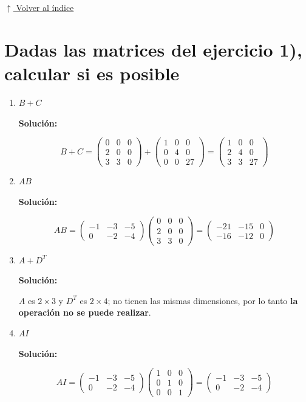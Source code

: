 \documentclass[12pt]{article}
\newcommand{\solucion}{%
    \vspace{0.8em}%
    \textbf{Solución:}%
}
\newcommand{\volverindice}{%
    \vspace{1em}%
    \begin{flushright}%
        \hyperlink{indice}{\small $\uparrow$ Volver al índice}%
    \end{flushright}%
}
\begin{document}
\volverindice
\newpage

\section{Dadas las matrices del ejercicio 1), calcular si es posible}

\begin{enumerate}[label=\alph*.-]
    \item $B + C$

    \solucion
    \[
    B + C =
    \begin{pmatrix} 0&0&0\\2&0&0\\3&3&0 \end{pmatrix}
    +
    \begin{pmatrix} 1&0&0\\0&4&0\\0&0&27 \end{pmatrix}
    =
    \begin{pmatrix} 1&0&0\\2&4&0\\3&3&27 \end{pmatrix}
    \]

    \item $AB$

    \solucion
    \[
    AB =
    \begin{pmatrix}-1&-3&-5\\0&-2&-4\end{pmatrix}
    \begin{pmatrix}0&0&0\\2&0&0\\3&3&0\end{pmatrix}
    =
    \begin{pmatrix}-21&-15&0\\-16&-12&0\end{pmatrix}
    \]

    \item $A + D^T$

    \solucion

    $A$ es $2\times3$ y $D^T$ es $2\times4$; no tienen las mismas dimensiones,
    por lo tanto \textbf{la operación no se puede realizar}.

    \item $AI$

    \solucion
    \[
    AI =
    \begin{pmatrix}-1&-3&-5\\0&-2&-4\end{pmatrix}
    \begin{pmatrix}1&0&0\\0&1&0\\0&0&1\end{pmatrix}
    =
    \begin{pmatrix}-1&-3&-5\\0&-2&-4\end{pmatrix}
    \]


\end{enumerate}
\end{document}
